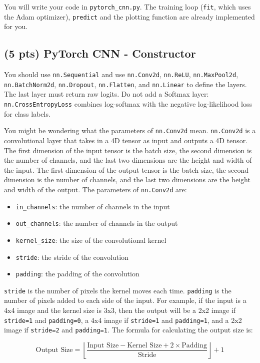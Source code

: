 \documentclass[11pt]{exam}
\begin{document}
You will write your code in \verb|pytorch_cnn.py|. The training loop (\verb|fit|, which uses the Adam optimizer), \verb|predict| and the plotting function are already implemented for you.

\subsection{(5 pts) PyTorch CNN - Constructor}
You should use \verb|nn.Sequential| and use \verb|nn.Conv2d|, \verb|nn.ReLU|, \verb|nn.MaxPool2d|, \verb|nn.BatchNorm2d|, \verb|nn.Dropout|, \verb|nn.Flatten|, and \verb|nn.Linear| to define the layers. The last layer must return raw logits. Do not add a Softmax layer: \verb|nn.CrossEntropyLoss| combines log-softmax with the negative log-likelihood loss for class labels.

You might be wondering what the parameters of \verb|nn.Conv2d| mean. \verb|nn.Conv2d| is a convolutional layer that takes in a 4D tensor as input and outputs a 4D tensor. The first dimension of the input tensor is the batch size, the second dimension is the number of channels, and the last two dimensions are the height and width of the input. The first dimension of the output tensor is the batch size, the second dimension is the number of channels, and the last two dimensions are the height and width of the output. The parameters of \verb|nn.Conv2d| are:
\begin{itemize}
    \item \verb|in_channels|: the number of channels in the input
    \item \verb|out_channels|: the number of channels in the output
    \item \verb|kernel_size|: the size of the convolutional kernel
    \item \verb|stride|: the stride of the convolution
    \item \verb|padding|: the padding of the convolution
\end{itemize}
\verb|stride| is the number of pixels the kernel moves each time. \verb|padding| is the number of pixels added to each side of the input. For example, if the input is a 4x4 image and the kernel size is 3x3, then the output will be a 2x2 image if \verb|stride=1| and \verb|padding=0|, a 4x4 image if \verb|stride=1| and \verb|padding=1|, and a 2x2 image if \verb|stride=2| and \verb|padding=1|. The formula for calculating the output size is:

$$ \text{Output Size} = \left\lfloor \frac{\text{Input Size} - \text{Kernel Size} + 2 \times \text{Padding}}{\text{Stride}} \right\rfloor + 1 $$
\end{document}
